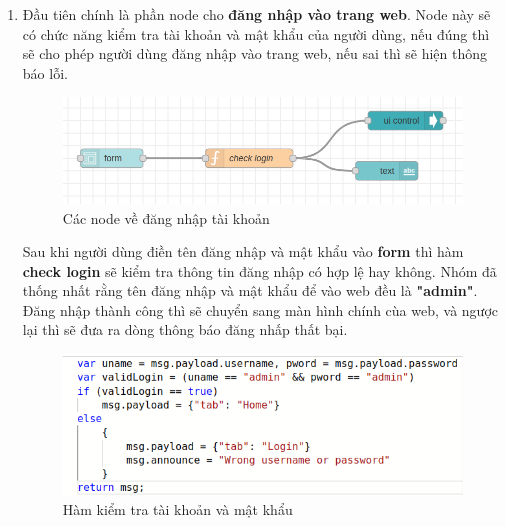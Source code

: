 \documentclass{report}
\begin{document}
\begin{enumerate}
    \item Đầu tiên chính là phần node cho \textbf{đăng nhập vào trang web}. Node này sẽ có chức năng kiểm tra tài khoản và mật khẩu của người dùng, nếu đúng thì sẽ cho phép người dùng đăng nhập vào trang web, nếu sai thì sẽ hiện thông báo lỗi.
    \begin{figure}[H]
        \includegraphics[width=\textwidth, keepaspectratio]{img/flow/login_node.png}
        \centering
        \caption{Các node về đăng nhập tài khoản}
    \end{figure}
    Sau khi người dùng điền tên đăng nhập và mật khẩu vào \textbf{form} thì hàm \textbf{check login} sẽ kiểm tra thông tin đăng nhập có hợp lệ hay không. Nhóm đã thống nhất rằng tên đăng nhập và mật khẩu để vào web đều là \textbf{"admin"}. Đăng nhập thành công thì sẽ chuyển sang màn hình chính cùa web, và ngược lại thì sẽ đưa ra dòng thông báo đăng nhấp thất bại.
    \begin{figure}[H]
        \includegraphics[width=\textwidth, keepaspectratio]{img/flow/check_login.png}
        \centering
        \caption{Hàm kiểm tra tài khoản và mật khẩu}
    \end{figure}


\end{enumerate}
\end{document}
